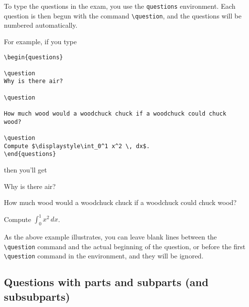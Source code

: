 \documentclass[12pt]{exam}
\begin{document}
To type the questions in the exam, you use the \verb"questions"
environment.  Each question is then begun with the command
\verb"\question", and the questions will be numbered automatically.

For example, if you type
%
\begin{verbatim}
\begin{questions}

\question
Why is there air?

\question

How much wood would a woodchuck chuck if a woodchuck could chuck
wood?

\question
Compute $\displaystyle\int_0^1 x^2 \, dx$.
\end{questions}
\end{verbatim}
%
then you'll get
%
\begin{questions}

\question
Why is there air?

\question

How much wood would a woodchuck chuck if a woodchuck could chuck
wood?

\question
Compute $\displaystyle\int_0^1 x^2 \, dx$.
\end{questions}

\bigskip

As the above example illustrates, you can leave blank lines between
the \verb"\question" command and the actual beginning of the
question, or before the first \verb"\question" command in the
environment, and they will be ignored.


\subsection{Questions with parts and subparts (and subsubparts)}
\end{document}

